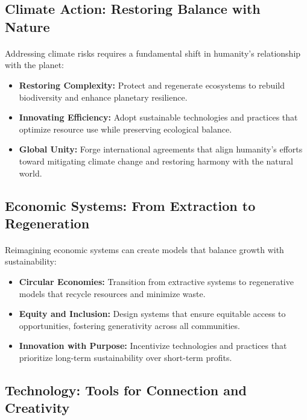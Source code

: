 \documentclass[12pt]{article}
\begin{document}
\subsection{Climate Action: Restoring Balance with Nature}
\paragraph{}
Addressing climate risks requires a fundamental shift in humanity’s relationship with the planet:
\begin{itemize}
    \item \textbf{Restoring Complexity:} Protect and regenerate ecosystems to rebuild biodiversity and enhance planetary resilience.
    \item \textbf{Innovating Efficiency:} Adopt sustainable technologies and practices that optimize resource use while preserving ecological balance.
    \item \textbf{Global Unity:} Forge international agreements that align humanity’s efforts toward mitigating climate change and restoring harmony with the natural world.
\end{itemize}

\subsection{Economic Systems: From Extraction to Regeneration}
\paragraph{}
Reimagining economic systems can create models that balance growth with sustainability:
\begin{itemize}
    \item \textbf{Circular Economies:} Transition from extractive systems to regenerative models that recycle resources and minimize waste.
    \item \textbf{Equity and Inclusion:} Design systems that ensure equitable access to opportunities, fostering generativity across all communities.
    \item \textbf{Innovation with Purpose:} Incentivize technologies and practices that prioritize long-term sustainability over short-term profits.
\end{itemize}

\subsection{Technology: Tools for Connection and Creativity}
\end{document}
